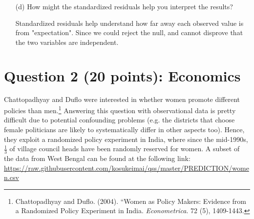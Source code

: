 \documentclass[12pt,letterpaper]{article}
\begin{document}
\begin{enumerate}
\begin{table}[h]
\begin{tabular}{l | c c c }
		\end{tabular}
	\end{table}

	
	
	\vspace{3cm}
	\item [(d)] How might the standardized residuals help you interpret the results?  
	
	Standardized residuals help understand how far away each observed value is from "expectation". Since we could reject the null, and cannot disprove that the two variables are independent.
	
\end{enumerate}
\newpage

\section*{Question 2 (20 points): Economics}
Chattopadhyay and Duflo were interested in whether women promote different policies than men.\footnote{Chattopadhyay and Duflo. (2004). ``Women as Policy Makers: Evidence from a Randomized Policy Experiment in India. \textit{Econometrica}. 72 (5), 1409-1443.} Answering this question with observational data is pretty difficult due to potential confounding problems (e.g. the districts that choose female politicians are likely to systematically differ in other aspects too). Hence, they exploit a randomized policy experiment in India, where since the mid-1990s, $\frac{1}{3}$ of village council heads have been randomly reserved for women. A subset of the data from West Bengal can be found at the following link: \url{https://raw.githubusercontent.com/kosukeimai/qss/master/PREDICTION/women.csv}\\
\end{document}
